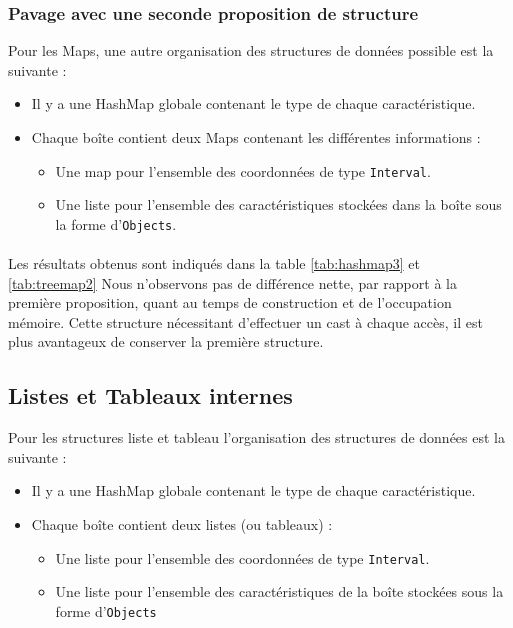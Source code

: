 \subsubsection{Pavage avec une seconde proposition de structure}
Pour les Maps, une autre organisation des structures de données possible est la suivante :
\begin{itemize}
\item Il y a une HashMap globale contenant le type de chaque caractéristique.
 \item Chaque boîte contient deux Maps contenant les différentes informations :
\begin{itemize}
 \item Une map pour l'ensemble des coordonnées de type \verb+Interval+.
\item Une liste pour l'ensemble des caractéristiques stockées dans la boîte sous la forme d'\verb+Objects+.
\end{itemize}
\end{itemize}

\paragraph{}Les résultats obtenus sont indiqués dans la table \ref{tab:hashmap3} et \ref{tab:treemap2}
Nous n'observons pas de différence nette, par rapport à la première proposition, quant au temps de construction et de l'occupation mémoire. Cette structure nécessitant d'effectuer un cast à chaque accès, il est plus avantageux de conserver la première structure.



\subsection{Listes et Tableaux internes}
Pour les structures liste et tableau l'organisation des structures de données est la suivante :
\begin{itemize}
\item Il y a une HashMap globale contenant le type de chaque caractéristique.
 \item Chaque boîte contient deux listes (ou tableaux) :
\begin{itemize}
 \item Une liste pour l'ensemble des coordonnées de type \verb+Interval+.
\item Une liste pour l'ensemble des caractéristiques de la boîte stockées sous la forme d'\verb+Objects+
\end{itemize}
\end{itemize}

